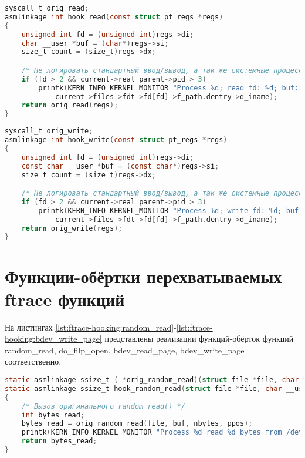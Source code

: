     \begin{lstlisting}[language=C, label=lst:syscall-hooking:read, caption=Функция-обёртка системного вызова read]
syscall_t orig_read;
asmlinkage int hook_read(const struct pt_regs *regs)
{
    unsigned int fd = (unsigned int)regs->di;
    char __user *buf = (char*)regs->si;
    size_t count = (size_t)regs->dx;

    /* Не логировать стандартный ввод/вывод, а так же системные процессы */
    if (fd > 2 && current->real_parent->pid > 3)
        printk(KERN_INFO KERNEL_MONITOR "Process %d; read fd: %d; buf: %p; count: %ld; filename: %s\n", current->pid, fd, buf, count,
            current->files->fdt->fd[fd]->f_path.dentry->d_iname);
    return orig_read(regs);
}
    \end{lstlisting}

    \begin{lstlisting}[language=C, label=lst:syscall-hooking:write, caption=Функция-обёртка системного вызова write]
syscall_t orig_write;
asmlinkage int hook_write(const struct pt_regs *regs)
{
    unsigned int fd = (unsigned int)regs->di;
    const char __user *buf = (const char*)regs->si;
    size_t count = (size_t)regs->dx;

    /* Не логировать стандартный ввод/вывод, а так же системные процессы */
    if (fd > 2 && current->real_parent->pid > 3)
        printk(KERN_INFO KERNEL_MONITOR "Process %d; write fd: %d; buf: %p; count: %ld; filename: %s\n", current->pid, fd, buf, count,
            current->files->fdt->fd[fd]->f_path.dentry->d_iname);
    return orig_write(regs);
}
    \end{lstlisting}

\section{Функции-обёртки перехватываемых ftrace функций}
    На листингах \ref{lst:ftrace-hooking:random_read}-\ref{lst:ftrace-hooking:bdev_write_page} 
    представлены реализации функций-обёрток функций random\_read, do\_filp\_open, bdev\_read\_page, bdev\_write\_page соответственно.

    \begin{lstlisting}[language=C, label=lst:ftrace-hooking:random_read, caption=Функция-обёртка функции random\_read]
static asmlinkage ssize_t ( *orig_random_read)(struct file *file, char __user *buf, size_t nbytes, loff_t *ppos);
static asmlinkage ssize_t hook_random_read(struct file *file, char __user *buf, size_t nbytes, loff_t *ppos)
{
    /* Вызов оригинального random_read() */
    int bytes_read;
    bytes_read = orig_random_read(file, buf, nbytes, ppos);
    printk(KERN_INFO KERNEL_MONITOR "Process %d read %d bytes from /dev/random\n", current->pid, bytes_read);
    return bytes_read;
}
    \end{lstlisting}

